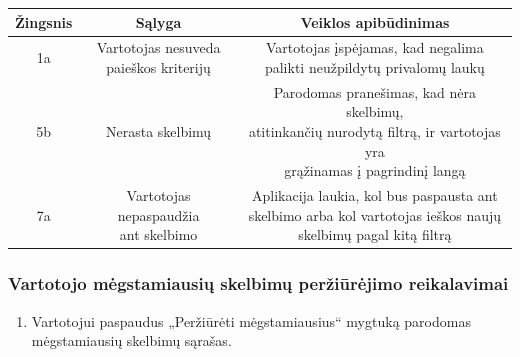 \documentclass[12pt]{article}
\begin{document}
\begin{center}
		\begin{tabular}{ | c | c | c | }
			\hline
			Žingsnis & Sąlyga                                     & Veiklos apibūdinimas \\ \hline
			1a       & \makecell{Vartotojas nesuveda \\ paieškos kriterijų} & \makecell{Vartotojas įspėjamas, kad negalima \\ palikti neužpildytų privalomų laukų} \\ \hline
			5b       & Nerasta skelbimų                           & \makecell{Parodomas pranešimas, kad nėra skelbimų, \\ atitinkančių nurodytą filtrą, ir vartotojas yra \\ grąžinamas į pagrindinį langą } \\ \hline
			7a       & \makecell{Vartotojas nepaspaudžia \\ ant skelbimo} & \makecell{Aplikacija laukia, kol bus paspausta ant \\ skelbimo arba kol vartotojas ieškos naujų \\  skelbimų pagal kitą filtrą} \\ \hline
		\end{tabular}
		\end{center}
	
	\subsubsection{Vartotojo mėgstamiausių skelbimų peržiūrėjimo reikalavimai}
	\begin{enumerate}[labelindent=10pt,leftmargin=2.2cm]
		\item Vartotojui paspaudus „Peržiūrėti mėgstamiausius“ mygtuką parodomas mėgstamiausių skelbimų sąrašas.
	\end{enumerate}
		
\end{document}
